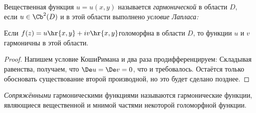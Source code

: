\documentclass[a4paper]{article}
\begin{document}
\begin{df}
Вещественная функция $u=u(x,y)$ называется \emph{гармонической} в области $D$, если $u \in \Cb^2(D)$ и в этой области
выполнено \emph{условие Лапласа:}
\end{df}

\begin{stm}
Если $f(z) = u\hr{x,y} + iv\hr{x,y}$\т голоморфна в области $D$, то функции $u$ и $v$ гармоничны в этой области.
\end{stm}
\begin{proof}
Напишем условие Коши\ч Римана и два раза продифференцируем:
Складывая равенства, получаем, что $\De u = \De v = 0$, что и требовалось. Остаётся только обосновать существование
второй производной, но это будет сделано позднее.
\end{proof}

\begin{df}
\emph{Сопряжёнными} гармоническими функциями называются гармонические функции,
являющиеся вещественной и мнимой частями некоторой голоморфной функции.
\end{df}
\end{document}
